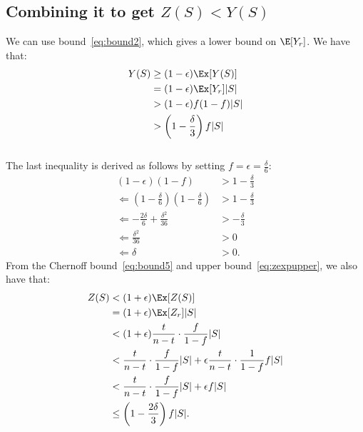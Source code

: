 
\subsection{Combining it to get $Z(S) < Y(S)$}
We can use bound~\ref{eq:bound2}, which gives a lower bound on $\E[Y_r]$.
We have that:
\begin{align}
Y(S) & \geq (1-\epsilon)\Ex[Y(S)] \\
& = (1-\epsilon)\Ex[Y_r] |S| \\
&> (1-\epsilon)f(1-f)|S|\\
&>  \left(1 - \frac{\delta}{3}\right)f|S| \label{eq:ylower}
\end{align}\\
The last inequality is derived as follows by setting $f = \epsilon = \frac{\delta}{6}$:
\begin{align}
 (1-\epsilon)(1-f) &> 1 - \frac{\delta}{3}\\
 \Leftarrow \left(1-\frac{\delta}{6}\right)\left(1-\frac{\delta}{6}\right) &> 1-\frac{\delta}{3}\\
 \Leftarrow -\frac{2\delta}{6} + \frac{\delta^2}{36} &> -\frac{\delta}{3}\\
 \Leftarrow \frac{\delta^2}{36} &> 0\\
 \Leftarrow \delta &> 0.
\end{align}
From the Chernoff bound~\ref{eq:bound5} and upper bound~\ref{eq:zexpupper}, we also have that:
\begin{align}
Z(S) &< (1+\epsilon)\Ex[Z(S)]\\
&=(1+\epsilon)\Ex[Z_r]|S|\\
&<(1+\epsilon)\frac{t}{n-t} \cdot \frac{f}{1-f} |S|\\
&<\frac{t}{n-t} \cdot \frac{f}{1-f} |S|+\epsilon\frac{t}{n-t} \cdot \frac{1}{1-f} f|S|\\
&< \frac{t}{n-t} \cdot \frac{f}{1-f} |S| + \epsilon f|S|\label{eq:balance}\\
&\leq \left(1 - \frac{2\delta}{3}\right)f|S|\label{eq:zupper}.
\end{align}\\

